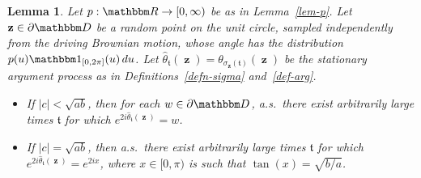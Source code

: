 \documentclass[11pt]{article}
\theoremstyle{plain}
\newtheorem{lem}[thm]{Lemma}
\theoremstyle{definition}
\numberwithin{equation}{section}
\newcommand{\BB}{\mathbbm}
\newcommand{\op}{\operatorname}
\newcommand{\wh}{\widehat}
\newcommand{\bdy}{\partial}
\newcommand{\zz}{{\op{\mathbf{z}}}}
\newcommand{\tz}{{\mathfrak t}}
\begin{document}
\begin{lem} \label{lem-recurrence}
Let $p : \BB R \to [0,\infty)$ be as in Lemma~\ref{lem-p}.  
Let $\zz \in \bdy\BB D$ be a random point on the unit circle, sampled independently from the driving Brownian motion, whose angle has the distribution $p(u) \BB 1_{[0,2\pi]}(u) \,du$.
Let $\wh\theta_{\tz} (\zz) = \theta_{\sigma_{\zz}(\tz)}(\zz)$ be the stationary argument process as in Definitions~\ref{defn-sigma} and~\ref{def-arg}.
\begin{itemize}
\item If $|c| < \sqrt{a b}$, then for each $w\in \bdy\BB D$, a.s.\ there exist arbitrarily large times $\tz$ for which $e^{2 i \wh\theta_{\tz}(\zz)} = w$.
\item If $|c| = \sqrt{a b}$, then a.s.\ there exist arbitrarily large times $\tz$ for which $e^{2 i \wh\theta_{\tz}(\zz)} = e^{2 i x}$, where $x\in [0,\pi)$ is such that $\tan(x) = \sqrt{b/a}$. 
\end{itemize}
\end{lem} 
\end{document}
